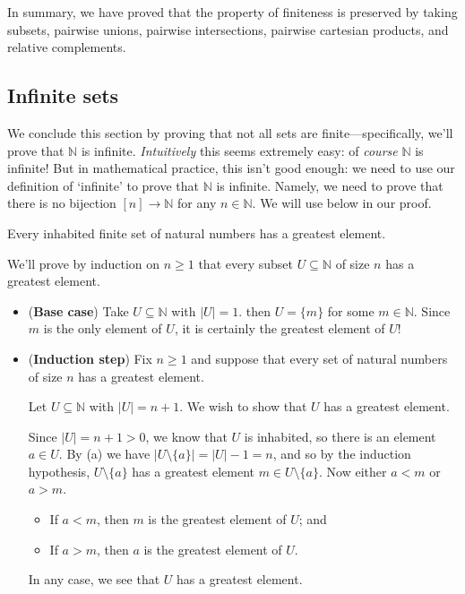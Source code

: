In summary, we have proved that the property of finiteness is preserved by taking subsets, pairwise unions, pairwise intersections, pairwise cartesian products, and relative complements. 

\subsection*{Infinite sets}

We conclude this section by proving that not all sets are finite---specifically, we'll prove that $\mathbb{N}$ is infinite. \textit{Intuitively} this seems extremely easy: of \textit{course} $\mathbb{N}$ is infinite! But in mathematical practice, this isn't good enough: we need to use our definition of `infinite' to prove that $\mathbb{N}$ is infinite. Namely, we need to prove that there is no bijection $[n] \to \mathbb{N}$ for any $n \in \mathbb{N}$. We will use  below in our proof.

\begin{lemma}
\label{lemFinSetGreatestElement}
Every inhabited finite set of natural numbers has a greatest element.
\end{lemma}
\begin{cproof}
We'll prove by induction on $n \ge 1$ that every subset $U \subseteq \mathbb{N}$ of size $n$ has a greatest element.
\begin{itemize}
\item (\textbf{Base case}) Take $U \subseteq \mathbb{N}$ with $|U|=1$. then $U = \{ m \}$ for some $m \in \mathbb{N}$. Since $m$ is the only element of $U$, it is certainly the greatest element of $U$!

\item (\textbf{Induction step}) Fix $n \ge 1$ and suppose that every set of natural numbers of size $n$ has a greatest element.

Let $U \subseteq \mathbb{N}$ with $|U| = n+1$. We wish to show that $U$ has a greatest element.

Since $|U| = n+1 > 0$, we know that $U$ is inhabited, so there is an element $a \in U$. By (a) we have $|U \setminus \{ a \}| = |U| - 1 = n$, and so by the induction hypothesis, $U \setminus \{ a \}$ has a greatest element $m \in U \setminus \{ a \}$. Now either $a < m$ or $a > m$.
\begin{itemize}
\item If $a < m$, then $m$ is the greatest element of $U$; and
\item If $a > m$, then $a$ is the greatest element of $U$.
\end{itemize}
In any case, we see that $U$ has a greatest element.
\end{itemize}
\end{cproof}

